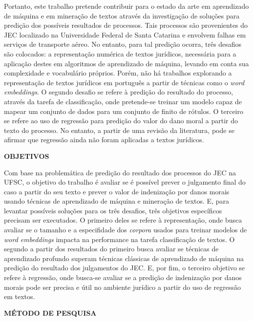 \begin{resumo}
    Portanto, este trabalho pretende contribuir para o estado da arte em aprendizado de máquina e em mineração de textos através da investigação de soluções para predição dos possíveis resultados de processos. Tais processos são provenientes do JEC localizado na Universidade Federal de Santa Catarina e envolvem falhas em serviços de transporte aéreo. No entanto, para tal predição ocorra, três desafios são colocados: a representação numérica de textos jurídicos, necessária para a aplicação destes em algoritmos de aprendizado de máquina, levando em conta sua complexidade e vocabulário próprios. Porém, não há trabalhos explorando a representação de textos jurídicos em português a partir de técnicas como o \textit{word embeddings}. O segundo desafio se refere à predição do resultado do processo, através da tarefa de classificação, onde pretende-se treinar um modelo capaz de mapear um conjunto de dados para um conjunto de finito de rótulos. O terceiro se refere ao uso de regressão para predição do valor do dano moral a partir do texto do processo. No entanto, a partir de uma revisão da literatura, pode se afirmar que regressão ainda não foram aplicadas a textos jurídicos.

\textbf{\textsf{OBJETIVOS}}

Com base na problemática de predição do resultado dos processos do JEC na UFSC, o objetivo do trabalho é avaliar se é possível prever o julgamento final do caso a partir do seu texto e prever o valor de indenização por danos morais usando técnicas de aprendizado de máquina e mineração de textos. E, para levantar possíveis soluções para os três desafios, três objetivos específicos precisam ser executados. O primeiro deles se refere à representação, onde busca avaliar se o tamanho e a especifidade dos \textit{corpora} usados para treinar modelos de \textit{word embeddings} impacta na performance na tarefa classificação de textos. O segundo a partir dos resultados do primeiro busca avaliar se técnicas de aprendizado profundo superam técnicas clássicas de aprendizado de máquina na predição do resultado dos julgamentos do JEC. E, por fim, o terceiro objetivo se refere à regressão, onde busca-se avaliar se a predição de indenização por danos morais pode ser precisa e útil no ambiente jurídico a partir do uso de regressão em textos.


\textbf{\textsf{MÉTODO DE PESQUISA}}



\end{resumo}
